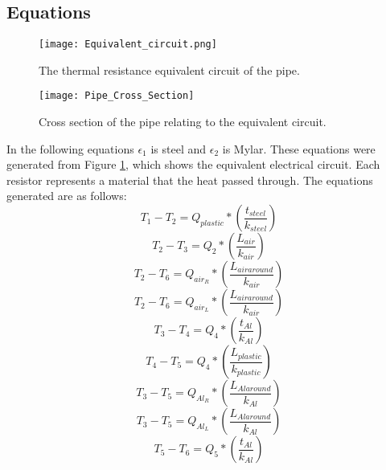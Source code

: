 \documentclass[11pt,english]{article}
\begin{document}
\subsection{Equations}
\begin{figure}[h!]
\centering
\texttt{[image: Equivalent\_circuit.png]}
\caption{The thermal resistance equivalent circuit of the pipe.}
\label{fig:Equivalent_circuit}
\end{figure}
\begin{figure}[h!]
\centering
\texttt{[image: Pipe\_Cross\_Section]}
\caption{Cross section of the pipe relating to the equivalent circuit.}
\label{fig:Pipe_Cross_Section}
\end{figure}
\newpage
 \label{App:modeling}
In the following equations $\epsilon_1$ is steel and $\epsilon_2$ is Mylar\textsuperscript{\textregistered}. These equations were generated from Figure \ref{fig:Equivalent_circuit}, which shows the equivalent electrical circuit. Each resistor represents a material that the heat passed through. The equations generated are as follows: \\
\begin{equation}\label{third}
T_1-T_2=Q_{plastic}*(\frac{t_{steel}}{k_{steel}})
\end{equation}
\begin{equation}\label{fourth}
T_2-T_3=Q_2*(\frac{L_{air}}{k_{air}})
\end{equation}
\begin{equation}\label{fifth}
T_2-T_6=Q_{air_R}*(\frac{L_{air around}}{k_{air}})
\end{equation}
\begin{equation}\label{sixth}
T_2-T_6=Q_{air_L}*(\frac{L_{air around}}{k_{air}})
\end{equation}
\begin{equation}\label{seventh}
T_3-T_4=Q_{4}*(\frac{t_{Al}}{k_{Al}})
\end{equation}
\begin{equation}\label{eigth}
T_4-T_5=Q_{4}*(\frac{L_{plastic}}{k_{plastic}})
\end{equation}
\begin{equation}\label{ninth}
T_3-T_5=Q_{Al_R}*(\frac{L_{Al around}}{k_{Al}})
\end{equation}
\begin{equation}\label{tenth}
T_3-T_5=Q_{Al_L}*(\frac{L_{Al around}}{k_{Al}})
\end{equation}
\begin{equation}\label{eleventh}
T_5-T_6=Q_{5}*(\frac{t_{Al}}{k_{Al}})
\end{equation}
\end{document}

